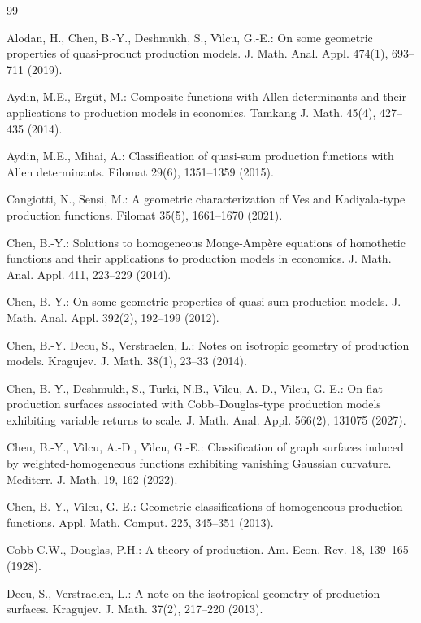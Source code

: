 \documentclass[12pt]{amsart}
\begin{document}
\begin{thebibliography}{99}

  Alodan, H., Chen, B.-Y.,  Deshmukh, S.,  V\^{\i}lcu, G.-E.: On some geometric properties of quasi-product production models.  J. Math. Anal. Appl. 474(1), 693--711 (2019).

  Aydin, M.E., Erg\"{u}t, M.: Composite functions with Allen determinants and their applications to production models in economics. Tamkang J. Math. 45(4), 427--435 (2014).

 Aydin, M.E., Mihai, A.: Classification of quasi-sum production functions with Allen determinants. Filomat 29(6), 1351--1359 (2015).

 Cangiotti, N., Sensi, M.:  A geometric characterization of Ves and Kadiyala-type production functions. Filomat 35(5), 1661--1670 (2021).

   Chen, B.-Y.: Solutions to homogeneous Monge-Amp\`{e}re equations of homothetic functions and their applications to production models in economics. J. Math. Anal. Appl. 411,  223--229 (2014).

 Chen, B.-Y.: On some geometric properties of quasi-sum production models. J. Math. Anal. Appl. 392(2),  192--199 (2012).

 Chen, B.-Y. Decu, S., Verstraelen, L.:  Notes on isotropic geometry of production models. Kragujev. J. Math. 38(1), 23--33  (2014).

Chen, B.-Y., Deshmukh, S., Turki, N.B., V\^{\i}lcu, A.-D., V\^{\i}lcu, G.-E.: On flat production surfaces associated with Cobb--Douglas-type production models exhibiting variable returns to scale. J. Math. Anal. Appl. 566(2), 131075  (2027).

 Chen, B.-Y., V\^{\i}lcu, A.-D., V\^{\i}lcu, G.-E.: Classification of graph surfaces induced by weighted-homogeneous functions exhibiting vanishing Gaussian curvature. Mediterr. J. Math. 19, 162 (2022).

 Chen, B.-Y., V\^{\i}lcu, G.-E.: Geometric classifications of homogeneous production functions. Appl. Math. Comput. 225,  345--351 (2013).

  Cobb C.W.,  Douglas, P.H.: A theory of production. Am. Econ. Rev. 18,  139--165 (1928).

 Decu, S., Verstraelen, L.: A note on the isotropical geometry of production surfaces. Kragujev. J. Math. 37(2), 217--220 (2013).


\end{thebibliography}
\end{document}
